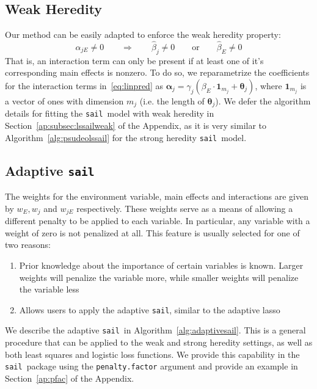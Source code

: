 \documentclass[12pt,letter]{article}\usepackage[]{graphicx}\usepackage[]{color}
\newcommand{\sail}{\texttt{sail}}
\newcommand{\tm}[1]{\textrm{{#1}}}
\newcommand{\balpha}{\boldsymbol{\alpha}}
\newcommand{\mb}[1]{\mathbf{#1}}
\newcommand{\btheta}{\boldsymbol{\theta}}
\begin{document}
\subsection{Weak Heredity}
Our method can be easily adapted to enforce the weak heredity property:
\begin{equation}
	\hat{\alpha}_{jE} \neq 0 \qquad \Rightarrow \qquad \hat{\beta}_j \neq 0 \qquad \tm{or} \qquad \hat{\beta}_E \neq 0   \label{eq:heredity2} \nonumber
\end{equation}
That is, an interaction term can only be present if at least one of it's corresponding main effects is nonzero. To do so, we reparametrize the coefficients for the interaction terms in~\eqref{eq:linpred} as $\balpha_{j} = \gamma_{j}  (\beta_E \cdot \mb{1}_{m_j} + \btheta_j)$, where $\mb{1}_{m_j}$ is a vector of ones with dimension $m_j$ (i.e. the length of $\btheta_j$). We defer the algorithm details for fitting the \sail ~model with weak heredity in Section~\ref{ap:subsec:lssailweak} of the Appendix, as it is very similar to Algorithm~\ref{alg:psudeolssail} for the strong heredity \sail ~model. 


\subsection{Adaptive \sail}

The weights for the environment variable, main effects and interactions are given by $w_E, w_j$ and $w_{jE}$ respectively. These weights serve as a means of allowing a different penalty to be applied to each variable. In particular, any variable with a weight of zero is not penalized at all. This feature is usually selected for one of two reasons:  

\begin{enumerate}
	\item Prior knowledge about the importance of certain variables is known. Larger weights will penalize the variable more, while smaller weights will penalize the variable less  
	\item Allows users to apply the adaptive \sail, similar to the adaptive lasso~\citep{zou2006adaptive}
\end{enumerate}  

We describe the adaptive \sail ~in Algorithm~\ref{alg:adaptivesail}. This is a general procedure that can be applied to the weak and strong heredity settings, as well as both least squares and logistic loss functions. We provide this capability in the \sail ~package using the \texttt{penalty.factor} argument and provide an example in Section~\ref{ap:pfac} of the Appendix.
\end{document}
